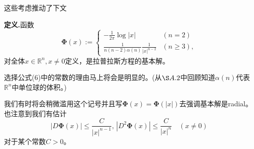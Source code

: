 \documentclass[leqno]{article}
\numberwithin{equation}{subsection}%
\begin{document}
这些考虑推动了下文
\par
\noindent\textbf{定义.}函数
\begin{equation}
\bm{\Phi}(x):=
\begin{cases}
-\frac{1}{2\pi}\log |x|\qquad &(n=2)\\
\frac{1}{n(n-2)\alpha(n)}\frac{1}{|x|^{n-2}}&(n\geq 3),
\end{cases}
\end{equation}
对全体$x\in\mathbb{R}^{n},x\neq 0$定义，是拉普拉斯方程的基本解。
\par
选择公式(6)中的常数的理由马上将会是明显的。(从$\S A.2$中回顾知道$\alpha(n)$代表$\mathbb{R}^{n}$中单位球的体积。)
\par
我们有时将会稍微滥用这个记号并且写$\bm{\Phi}(x)=\bm{\Phi}(|x|)$去强调基本解是radial。也注意到我们有估计
\begin{equation}
|D\bm{\Phi}(x)|\leq\frac{C}{|x|^{n-1}},\,|D^{2}\bm{\Phi}(x)|\leq\frac{C}{|x|^{n}}\quad(x\neq 0)
\end{equation}
对于某个常数$C>0$。
\end{document}
